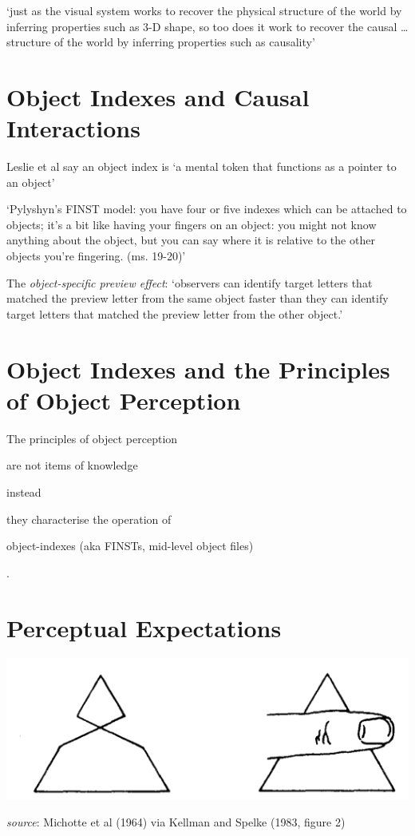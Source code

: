 \documentclass[12pt]{extarticle}
\begin{document}
\begin{multicols}{3}
‘just as the visual system works to recover the physical structure of the world by inferring 
properties such as 3-D shape, so too does it work to recover the causal …  structure of 
the world by inferring properties such as causality’ 
\citep[p.\ 299]{Scholl:2000eq}
 
 
 
\section{Object Indexes and Causal Interactions}
 
Leslie et al say an object index is ‘a mental token that functions as a pointer to an 
object’ \citep[p.\ 11]{Leslie:1998zk}
 
‘Pylyshyn’s FINST model: you have four or five indexes which can be attached to objects; 
it’s a bit like having your fingers on an object: you might not know anything about the object, but you can say where it is relative to the other objects you’re fingering. (ms. 19-20)’ \citep{Scholl:1999mi}
 
The \emph{object-specific preview effect}: ‘observers can identify target letters that matched the preview letter from the same object faster than they can identify target letters that matched the preview letter from the other object.’
\citep[p.\ 2]{Krushke:1996ge}
 
 
 
\section{Object Indexes and the Principles of Object Perception}
 
The principles of object perception

are not items of knowledge 

instead 

they characterise the operation of 

object-indexes (aka FINSTs, mid-level object files)

\citep{Leslie:1998zk,Scholl:1999mi,Carey:2001ue}.
 
 
 
\section{Perceptual Expectations}
 
\begin{center}
\includegraphics[scale=0.3]{img/kellman_1983_fig2.neg.png}
\end{center}
\emph{source}: Michotte et al (1964) via Kellman and Spelke (1983, figure 2)
 

\end{multicols}
\end{document}
